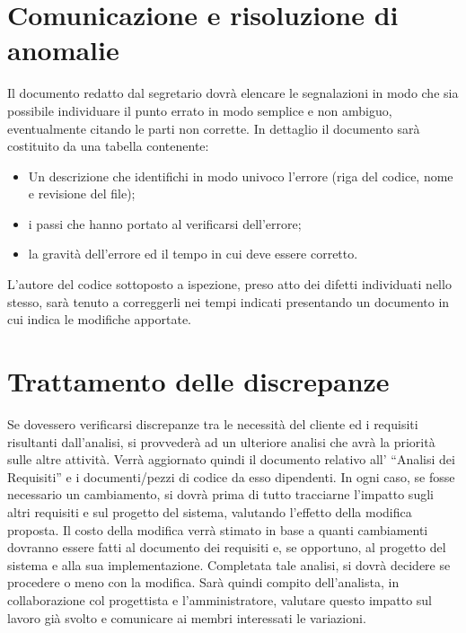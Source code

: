 \documentclass[11pt,titlepage,a4paper]{report}
\begin{document}
\section{Comunicazione e risoluzione di anomalie}
Il documento redatto dal segretario dovr\`a elencare le segnalazioni in modo che sia possibile individuare il punto errato in modo semplice e non ambiguo, eventualmente citando le parti non corrette. In dettaglio il documento sar\`a costituito da una tabella contenente:
\begin{itemize}
\item Un descrizione che identifichi in modo univoco l'errore (riga del codice, nome e revisione del file);
\item i passi che hanno portato al verificarsi dell'errore;
\item la gravit\`a dell'errore ed il tempo in cui deve essere corretto.
\end{itemize}
L'autore del codice sottoposto a ispezione, preso atto dei difetti individuati nello stesso, sar\`a tenuto a correggerli nei tempi indicati presentando un documento in cui indica le modifiche apportate.

\section{Trattamento delle discrepanze} 
Se dovessero verificarsi discrepanze tra le necessit\`a del cliente ed i requisiti risultanti dall'analisi, si provveder\`a ad un ulteriore analisi che avr\`a la priorit\`a sulle altre attivit\`a. Verr\`a aggiornato quindi il documento relativo all' ``Analisi dei Requisiti'' e  i documenti/pezzi di codice da esso dipendenti. In ogni caso, se fosse necessario un cambiamento, si dovr\`a prima di tutto tracciarne l'impatto sugli altri requisiti e sul progetto del sistema, valutando l'effetto della modifica proposta. Il costo della modifica verr\`a stimato in base a quanti cambiamenti dovranno essere fatti al documento dei requisiti e, se opportuno, al progetto del sistema e alla sua implementazione. Completata tale analisi, si dovr\`a decidere se procedere o meno con la modifica. Sar\`a quindi compito dell'analista, in collaborazione col progettista e l'amministratore, valutare questo impatto sul lavoro gi\`a svolto e comunicare ai membri interessati le variazioni.
\end{document}
